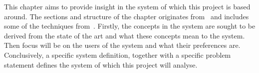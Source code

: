 This chapter aims to provide insight in the system of which this project is based around. The sections and structure of the chapter originates from~\cite{mathiassen2001objektorienteret} and includes some of the techniques from~\cite{benyon2013designing}. Firstly, the concepts in the system are sought to be derived from the state of the art and what these concepts mean to the system. Then focus will be on the users of the system and what their preferences are. Conclusively, a specific system definition, together with a specific problem statement defines the system of which this project will analyse.